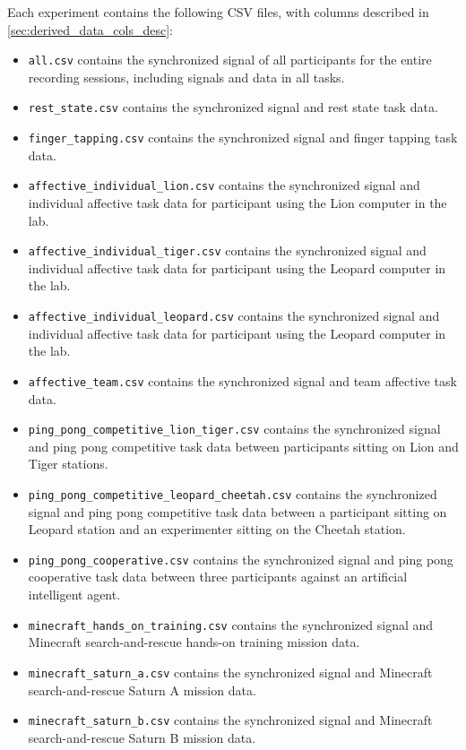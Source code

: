 Each experiment contains the following CSV files, with columns described in \ref{sec:derived_data_cols_desc}:
%
\begin{itemize}
  \item \texttt{all.csv} contains the synchronized signal of all participants for the entire recording sessions, including signals and data in all tasks.
  \item \texttt{rest\_state.csv} contains the synchronized signal and rest state task data.
  \item \texttt{finger\_tapping.csv} contains the synchronized signal and finger tapping task data.
  \item \texttt{affective\_individual\_lion.csv} contains the synchronized signal and individual affective task data for participant using the Lion computer in the lab.
  \item \texttt{affective\_individual\_tiger.csv} contains the synchronized signal and individual affective task data for participant using the Leopard computer in the lab.
  \item \texttt{affective\_individual\_leopard.csv} contains the synchronized signal and individual affective task data for participant using the Leopard computer in the lab.
  \item \texttt{affective\_team.csv} contains the synchronized signal and team affective task data.
  \item \texttt{ping\_pong\_competitive\_lion\_tiger.csv} contains the synchronized signal and ping pong competitive task data between participants sitting on Lion and Tiger stations.
  \item \texttt{ping\_pong\_competitive\_leopard\_cheetah.csv} contains the synchronized signal and ping pong competitive task data between a participant sitting on Leopard station and an experimenter sitting on the Cheetah station.
  \item \texttt{ping\_pong\_cooperative.csv} contains the synchronized signal and ping pong cooperative task data between three participants against an artificial intelligent agent.
  \item \texttt{minecraft\_hands\_on\_training.csv} contains the synchronized signal and Minecraft search-and-rescue hands-on training mission data.
  \item \texttt{minecraft\_saturn\_a.csv} contains the synchronized signal and Minecraft search-and-rescue Saturn A mission data.
  \item \texttt{minecraft\_saturn\_b.csv} contains the synchronized signal and Minecraft search-and-rescue Saturn B mission data.
\end{itemize}

